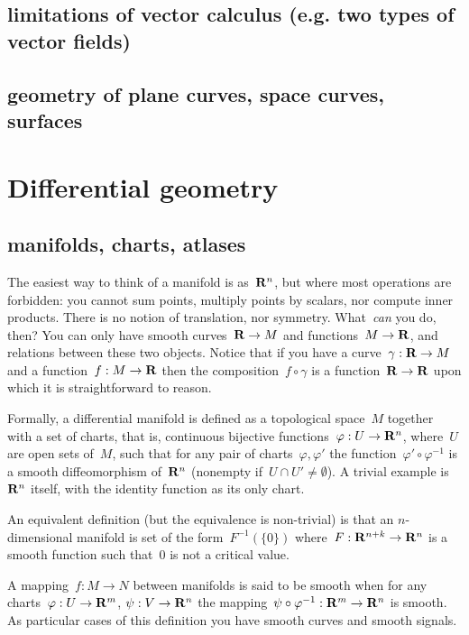 \subsection{limitations of vector calculus (e.g. two types of vector fields)}

\subsection{geometry of plane curves, space curves, surfaces}


\clearpage
\section{Differential geometry}


\subsection{manifolds, charts, atlases}

The easiest way to think of a manifold is as~$\mathbf{R}^n$, but where most operations
are forbidden: you cannot sum points, multiply points by scalars,
nor compute inner products.  There is no notion of translation, nor
symmetry.  What~\emph{can} you do, then?  You can only have smooth
curves~$\mathbf{R}\to M$ and functions~$M\to\mathbf{R}$, and relations between
these two objects.  Notice that if you have a curve~$\gamma:\mathbf{R}\to M$ and a
function~$f:M\to\mathbf{R}$ then the composition~$f\circ\gamma$ is a
function~$\mathbf{R}\to\mathbf{R}$ upon which it is straightforward to reason.

Formally, a differential manifold is defined as a topological space~$M$
together with a set of charts, that is, continuous bijective
functions~$\varphi:U\to\mathbf{R}^n$, where~$U$ are open sets of~$M$, such that for
any pair of charts~$\varphi,\varphi'$ the
function~$\varphi'\circ\varphi^{-1}$ is a smooth diffeomorphism of~$\mathbf{R}^n$
(nonempty if~$U\cap U'\neq\emptyset$).  A trivial example is~$\mathbf{R}^n$ itself,
with the identity function as its only chart.

An equivalent definition (but the equivalence is non-trivial) is that an
$n$-dimensional manifold is set of the form~$F^{-1}(\{0\})$
where~$F:\mathbf{R}^{n+k}\to\mathbf{R}^n$ is a smooth function such that~$0$ is not a
critical value.

A mapping~$f:M\to N$ between manifolds is said to be smooth when for any
charts~$\varphi:U\to\mathbf{R}^m$, $\psi:V\to\mathbf{R}^n$ the
mapping~$\psi\circ\varphi^{-1}:\mathbf{R}^m\to\mathbf{R}^n$ is smooth.
As particular cases  of this definition you have smooth curves and smooth
signals.

